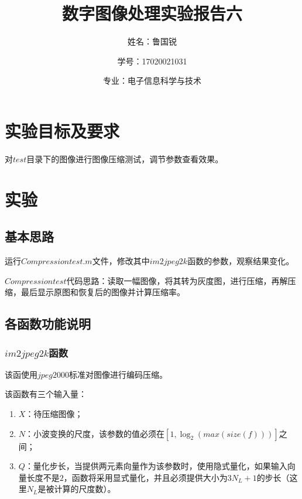 \documentclass[UTF8]{ctexart}
\title{数字图像处理实验报告六}
\author{姓名：鲁国锐 \protect\newline
\and 学号：17020021031 \\
\and 专业：电子信息科学与技术}
\begin{document}
	\maketitle
	\renewcommand{\contentsname}{目录}
	\renewcommand{\listfigurename}{插图目录}
	\renewcommand{\listtablename}{表格目录}
	\renewcommand{\refname}{参考文献}
	\renewcommand{\abstractname}{摘要}
	\renewcommand{\indexname}{索引}
	\renewcommand{\tablename}{表}
	\renewcommand{\figurename}{图}
	
	
	
	\tableofcontents
	\newpage
	
	\hypersetup{
	bookmarks=true,
	colorlinks=true,
	linkcolor=red,
	urlcolor=blue
	}
    
    \section{实验目标及要求}
        \indent 对$test$目录下的图像进行图像压缩测试，调节参数查看效果。  


    \section{实验}
        
        \subsection{基本思路}

                
            \indent 运行$Compressiontest.m$文件，修改其中$im2jpeg2k$函数的参数，观察结果变化。  
                
            \indent $Compressiontest$代码思路：读取一幅图像，将其转为灰度图，进行压缩，再解压缩，最后显示原图和恢复后的图像并计算压缩率。
                   
        
        \subsection{各函数功能说明}
        
            \subsubsection{$im2jpeg2k$函数}
                
                \indent 该函使用$jpeg2000$标准对图像进行编码压缩。
                
                \indent 该函数有三个输入量：
                \begin{enumerate}[leftmargin=50pt]
    				\item $X$：待压缩图像；
                    \item $N$：小波变换的尺度，该参数的值必须在$\left[ 1, \log_2\left(max\left(size\left( f \right)\right) \right) \right]$之间；
                    \item $Q$：量化步长，当提供两元素向量作为该参数时，使用隐式量化，如果输入向量长度不是$2$，函数将采用显式量化，并且必须提供大小为$3N_L+1$的步长（这里$N_L$是被计算的尺度数）。
    			\end{enumerate}
                
\end{document}
